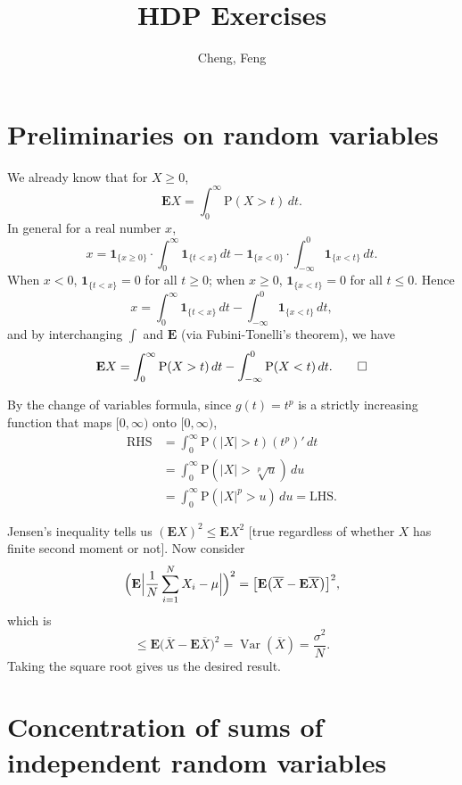 \documentclass[11pt]{article}
\title{HDP Exercises}
\author{Cheng, Feng}
\date{}
\newcommand{\abs}[1]{\lvert #1 \rvert}
\newcommand{\ol}[1]{\overline{#1}}
\renewcommand{\Pr}{\mathrm{P}}
\newcommand{\E}{\mathbf{E}}
\newcommand{\I}[1]{\mathbf{1}_{\{#1\}}}
\newcommand{\Var}{\operatorname{Var}}
\theoremstyle{plain}
\theoremstyle{definition}
\theoremstyle{remark}
\theoremstyle{definition}
\newenvironment{mansol}[1]{%
  \renewcommand\themansolinner{#1}%
  \mansolinner
}{\endmansolinner}
\begin{document}
\maketitle

\section{Preliminaries on random variables}
\begin{mansol}{1.2.2}
    We already know that for $X \geq 0$, \[\E X = \int_{0}^\infty \Pr(X > t) \, dt.\] In general for a real number $x$, \[
    x = \I{x \geq 0} \cdot \int_0^\infty \I{t < x} \,dt - \I{x < 0} \cdot \int_{-\infty}^0 \I{x < t} \,dt.
\]
When $x<0$, $\I{t<x} = 0$ for all $t\geq 0$; when $x \geq 0$, $\I{x<t} = 0$ for all $t \leq 0$. Hence \[x = \int_0^\infty \I{t < x} \,dt - \int_{-\infty}^0 \I{x < t} \,dt,
\]
and by interchanging $\int$ and $\E$ (via Fubini-Tonelli's theorem), we have \[ \E X = \int_{0}^\infty \Pr(X > t) \, dt - \int_{-\infty}^0 \Pr(X < t) \,dt. \qedhere\]
\end{mansol}

\begin{mansol}{1.2.3}
By the change of variables formula, since $g(t) = t^p$ is a strictly increasing function that maps $[0,\infty)$ onto $[0,\infty)$,
\begin{align*}
\text{RHS} & = \int_0^\infty \Pr(\abs X  > t) (t^p)'\,dt \\
& = \int_0^\infty \Pr(\abs X > \sqrt[p]{u})\,du \\ & = \int_0^\infty \Pr(\abs X ^p > u) \,du = \text{LHS}.
\end{align*}
\end{mansol}

\begin{mansol}{1.3.3}
Jensen's inequality tells us $(\E X)^2 \leq \E X^2$ [true regardless of whether $X$ has finite second moment or not]. Now consider \[
\Bigl(\E \Big\lvert\frac{1}{N} \sum_{i=1}^N X_i - \mu\Big\rvert \Bigr)^2 = \bigl[\E\bigl(\ol{X} - \E\ol{X}\bigr)\bigr]^2,
\] which is
\[
\leq \E \bigl(\ol X - \E \ol X \bigr)^2 = \Var(\ol X) = \frac{\sigma^2}{N}.
\]
Taking the square root gives us the desired result.
\end{mansol}

\section{Concentration of sums of independent random variables}
\end{document}

